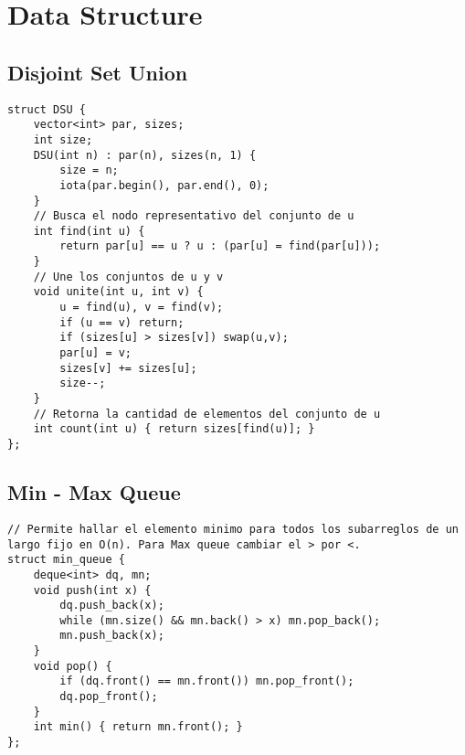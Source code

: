 \documentclass[10pt,letterpaper,twocolumn,twosided]{article}
\begin{document}

\section{Data Structure}

\subsection{Disjoint Set Union}
\begin{lstlisting}
struct DSU {
    vector<int> par, sizes;
    int size;
    DSU(int n) : par(n), sizes(n, 1) {
        size = n;
        iota(par.begin(), par.end(), 0);
    }
    // Busca el nodo representativo del conjunto de u
    int find(int u) {
        return par[u] == u ? u : (par[u] = find(par[u]));
    }
    // Une los conjuntos de u y v
    void unite(int u, int v) {
        u = find(u), v = find(v);
        if (u == v) return;
        if (sizes[u] > sizes[v]) swap(u,v);
        par[u] = v;
        sizes[v] += sizes[u];
        size--;
    }
    // Retorna la cantidad de elementos del conjunto de u
    int count(int u) { return sizes[find(u)]; }
};
\end{lstlisting}

\subsection{Min - Max Queue}
\begin{lstlisting}
// Permite hallar el elemento minimo para todos los subarreglos de un largo fijo en O(n). Para Max queue cambiar el > por <.
struct min_queue {
    deque<int> dq, mn;
    void push(int x) {
        dq.push_back(x);
        while (mn.size() && mn.back() > x) mn.pop_back();
        mn.push_back(x);
    }
    void pop() {
        if (dq.front() == mn.front()) mn.pop_front();
        dq.pop_front();
    }
    int min() { return mn.front(); }
};
\end{lstlisting}

\vfill
\end{document}
